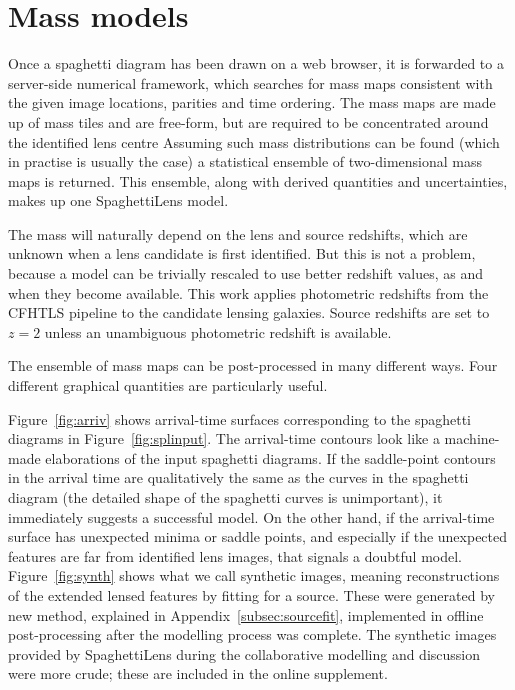 \section{Mass models}\label{sec:massmodels}

Once a spaghetti diagram has been drawn on a web browser, it is
forwarded to a server-side numerical framework, which searches for
mass maps consistent with the given image locations, parities and time
ordering.  The mass maps are made up of mass tiles and are free-form,
but are required to be concentrated around the identified lens centre
\citep[see][for the precise formulation of the search
  problem.]{2014MNRAS.445.2181C} Assuming such mass distributions can
be found (which in practise is usually the case) a statistical
ensemble of two-dimensional mass maps is returned.  This ensemble,
along with derived quantities and uncertainties, makes up one
SpaghettiLens model.

The mass will naturally depend on the lens and source redshifts, which
are unknown when a lens candidate is first identified.  But this is
not a problem, because a model can be trivially rescaled to use better
redshift values, as and when they become available.  This work applies
photometric redshifts from the CFHTLS pipeline to the candidate
lensing galaxies.  Source redshifts are set to $z=2$ unless an
unambiguous photometric redshift is available.

The ensemble of mass maps can be post-processed in many different
ways.  Four different graphical quantities are particularly useful.

Figure~\ref{fig:arriv} shows arrival-time surfaces corresponding to
the spaghetti diagrams in Figure~\ref{fig:splinput}.  The arrival-time
contours look like a machine-made elaborations of the input spaghetti
diagrams.  If the saddle-point contours in the arrival time are
qualitatively the same as the curves in the spaghetti diagram (the
detailed shape of the spaghetti curves is unimportant), it immediately
suggests a successful model.  On the other hand, if the arrival-time
surface has unexpected minima or saddle points, and especially if the
unexpected features are far from identified lens images, that signals
a doubtful model.  Figure~\ref{fig:synth} shows what we call synthetic
images, meaning reconstructions of the extended lensed features by
fitting for a source.  These were generated by new method, explained
in Appendix~\ref{subsec:sourcefit}, implemented in offline
post-processing after the modelling process was complete.  The
synthetic images provided by SpaghettiLens during the collaborative
modelling and discussion were more crude; these are included in the
online supplement.

